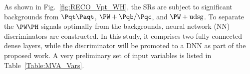 \documentclass[a4paper,11pt]{article}
\newcommand{\Pb}{{{\Pqb}}\xspace}
\newcommand{\Pt}{{{\Pqt}}\xspace}
\newcommand{\Pc}{{{\Pqc}}\xspace}
\newcommand{\PAt}{{{{\Paqt}}}\xspace}
\renewcommand{\PV}{{{{V}}}\xspace}
\begin{document}
As shown in Fig.~\ref{fig:RECO_Vpt_WH}, the SRs are subject to significant backgrounds from $\Pt\PAt$, ${\PW}+\Pb/\Pc$, and ${\PW}+\textrm{udsg}$. 
To separate the  $\PW\PH$ signals optimally from the backgrounds, neural network (NN) discriminators are constructed. 
In this study, it comprises two fully connected dense layers, while the discriminator will be promoted to a DNN 
as part of the proposed work.
A very preliminary set of input variables is listed in Table~\ref{Table:MVA_Vars}.

\end{document}
